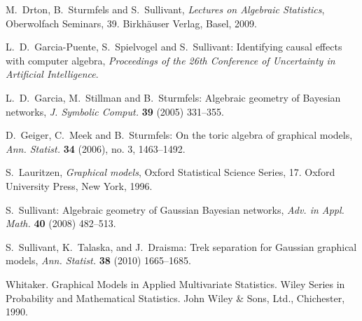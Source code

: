 \documentclass[letterpaper]{article}
\theoremstyle{definition}
\begin{document}
\begin{thebibliography}{20}



M.~Drton, B.~Sturmfels and S.~Sullivant, \emph{Lectures on Algebraic Statistics}, 
Oberwolfach Seminars, 39. Birkh\"auser Verlag, Basel, 2009.



 L.~D.~Garcia-Puente, S.~Spielvogel and S.~Sullivant: Identifying
causal effects with computer algebra, {\em Proceedings of the 26th
Conference of Uncertainty in Artificial Intelligence}.

 L.~D.~Garcia, M.~Stillman and B.~Sturmfels: 
Algebraic geometry of Bayesian networks, {\em J. Symbolic Comput.}
  {\bf 39} (2005) 331--355.
  
D.~Geiger, C.~Meek and B.~Sturmfels: On the toric algebra of graphical
models, {\em Ann. Statist.} {\bf 34} (2006), no. 3, 1463--1492.


S.~Lauritzen,  \emph{Graphical models}, Oxford Statistical Science Series, 17. Oxford University Press, New York, 1996.


 S.~Sullivant: Algebraic geometry of Gaussian Bayesian
  networks, {\em Adv. in Appl. Math.} {\bf 40} (2008) 482--513.

S.~Sullivant, K.~Talaska, and J.~Draisma: Trek separation for Gaussian
graphical models, {\em Ann. Statist.} {\bf 38} (2010) 1665--1685. 



  Whitaker.  Graphical Models in Applied Multivariate
  Statistics. Wiley Series in Probability and Mathematical Statistics. John Wiley \& Sons, Ltd., Chichester, 1990.


\end{thebibliography}
\end{document}
